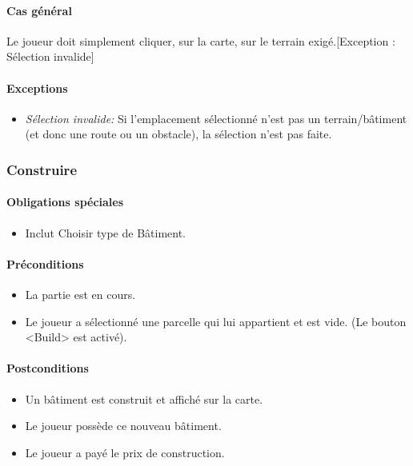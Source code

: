 \documentclass[a4paper,11pt]{report}
\begin{document}
\paragraph{Cas général}
Le joueur doit simplement cliquer, sur la carte, sur le terrain exigé.[Exception : Sélection invalide]
\paragraph{Exceptions}
\begin{itemize}
	\item \textit{Sélection invalide:} Si l'emplacement sélectionné n'est pas un terrain/bâtiment (et donc une route ou un obstacle), la sélection n'est pas faite.
\end{itemize}

\subsubsection{Construire}
\paragraph{Obligations spéciales}
\begin{itemize}
 \item Inclut Choisir type de Bâtiment.
\end{itemize}
\paragraph{Préconditions}
\begin{itemize}
 \item La partie est en cours.
 \item Le joueur a sélectionné une parcelle qui lui appartient et est vide. (Le bouton <Build> est activé).
\end{itemize}
\paragraph{Postconditions}
\begin{itemize}
 \item Un bâtiment est construit et affiché sur la carte.
 \item Le joueur possède ce nouveau bâtiment.
 \item Le joueur a payé le prix de construction.
\end{itemize}
\end{document}
